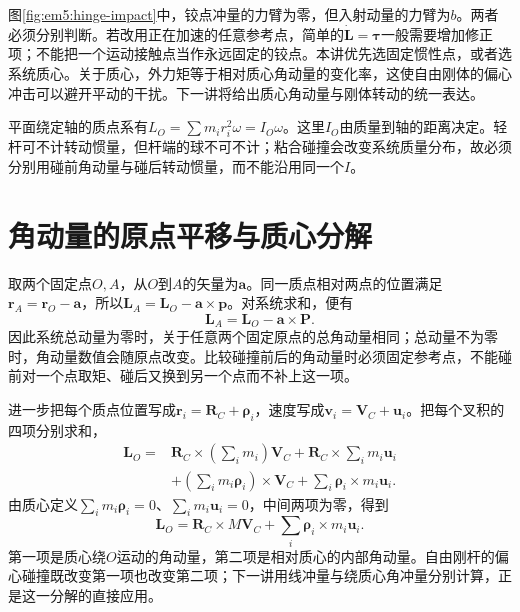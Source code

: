 
图\ref{fig:em5:hinge-impact}中，铰点冲量的力臂为零，但入射动量的力臂为$b$。两者必须分别判断。若改用正在加速的任意参考点，简单的$\dot{\bm L}=\bm\tau$一般需要增加修正项；不能把一个运动接触点当作永远固定的铰点。本讲优先选固定惯性点，或者选系统质心。关于质心，外力矩等于相对质心角动量的变化率，这使自由刚体的偏心冲击可以避开平动的干扰。下一讲将给出质心角动量与刚体转动的统一表达。

平面绕定轴的质点系有$L_O=\sum m_ir_i^2\omega=I_O\omega$。这里$I_O$由质量到轴的距离决定。轻杆可不计转动惯量，但杆端的球不可不计；粘合碰撞会改变系统质量分布，故必须分别用碰前角动量与碰后转动惯量，而不能沿用同一个$I$。

\section{角动量的原点平移与质心分解}

取两个固定点$O,A$，从$O$到$A$的矢量为$\bm a$。同一质点相对两点的位置满足$\bm r_A=\bm r_O-\bm a$，所以$\bm L_A=\bm L_O-\bm a\times\bm p$。对系统求和，便有
\[\bm L_A=\bm L_O-\bm a\times\bm P.\]
因此系统总动量为零时，关于任意两个固定原点的总角动量相同；总动量不为零时，角动量数值会随原点改变。比较碰撞前后的角动量时必须固定参考点，不能碰前对一个点取矩、碰后又换到另一个点而不补上这一项。

进一步把每个质点位置写成$\bm r_i=\bm R_C+\bm\rho_i$，速度写成$\bm v_i=\bm V_C+\bm u_i$。把每个叉积的四项分别求和，
\begin{align*}
\bm L_O={}&\bm R_C\times\left(\sum_i m_i\right)\bm V_C
+\bm R_C\times\sum_i m_i\bm u_i\\
&+\left(\sum_i m_i\bm\rho_i\right)\times\bm V_C
+\sum_i\bm\rho_i\times m_i\bm u_i.
\end{align*}
由质心定义$\sum_i m_i\bm\rho_i=0$、$\sum_i m_i\bm u_i=0$，中间两项为零，得到
\[\bm L_O=\bm R_C\times M\bm V_C+\sum_i\bm\rho_i\times m_i\bm u_i.\]
第一项是质心绕$O$运动的角动量，第二项是相对质心的内部角动量。自由刚杆的偏心碰撞既改变第一项也改变第二项；下一讲用线冲量与绕质心角冲量分别计算，正是这一分解的直接应用。

